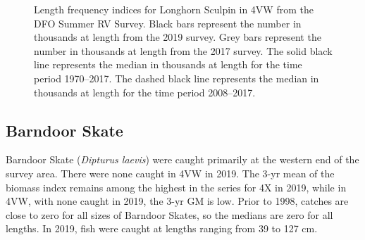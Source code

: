 \documentclass[11pt]{book}
\begin{document}
\begin{figure}[htb]

{\centering {} 

}

\caption{Length frequency indices for Longhorn Sculpin in 4VW from the DFO Summer RV Survey. Black bars represent the number in thousands at length from the 2019 survey. Grey bars represent the number in thousands at length from the 2017 survey. The solid black line represents the median in thousands at length for the time period 1970--2017. The dashed black line represents the median in thousands at length for the time period 2008--2017.}\label{fig:79-fig-lsculpin-lengthfreq4VW}
\end{figure}
\clearpage

\hypertarget{barndoor-skate}{%
\subsection{Barndoor Skate}\label{barndoor-skate}}

Barndoor Skate (\emph{Dipturus laevis}) were caught primarily at the western end of the survey area. There were none caught in 4VW in 2019. The 3-yr mean of the biomass index remains among the highest in the series for 4X in 2019, while in 4VW, with none caught in 2019, the 3-yr GM is low. Prior to 1998, catches are close to zero for all sizes of Barndoor Skates, so the medians are zero for all lengths. In 2019, fish were caught at lengths ranging from 39 to 127 cm.
\end{document}
